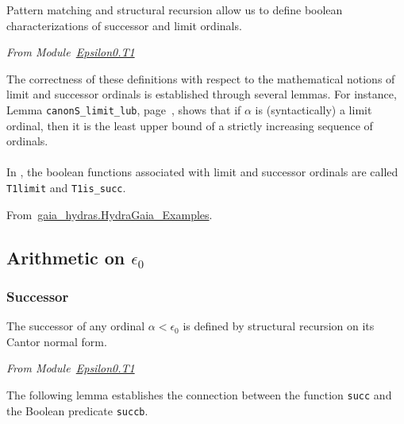 Pattern matching and structural recursion allow us to define boolean characterizations  of successor and limit ordinals.


\vspace{4pt}
\noindent
\emph{From Module~\href{../theories/html/hydras.Epsilon0.T1.html\#succb}{Epsilon0.T1}}






The correctness of these definitions with respect to the mathematical notions of
limit and successor ordinals is established through several lemmas. For instance,
Lemma \texttt{canonS\_limit\_lub}, page~\pageref{lemma:canonS-limit}, shows that
if $\alpha$ is (syntactically) a limit ordinal, then it is the least upper bound of
a strictly increasing sequence of ordinals.


\paragraph*{\gaiasign}
In \gaia, the boolean functions associated with limit and successor ordinals are called \texttt{T1limit} and \texttt{T1is\_succ}.

 From~\href{../theories/html/gaia_hydras.HydraGaia_Examples.html}{gaia\_hydras.HydraGaia\_Examples}.

  





\subsection{Arithmetic on \texorpdfstring{$\epsilon_0$}{epsilon0}}
\subsubsection{Successor}


The successor of any ordinal $\alpha< \epsilon_0$ is defined by structural 
recursion on its Cantor normal form.

\label{Functions:succ-T1}

\vspace{4pt}
\emph{From Module~\href{../theories/html/hydras.Epsilon0.T1.html\#succ}{Epsilon0.T1}}




The following lemma establishes the connection between the  function
\texttt{succ} and the Boolean predicate \texttt{succb}.

